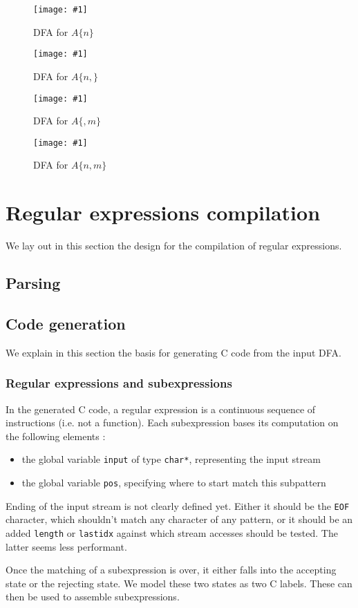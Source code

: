 \documentclass[11pt,a4paper]{report}
\newcommand{\regexp}[1]{$#1$}
\newcommand{\ccode}[1]{\texttt{#1}}
\newcommand{\insertfa}[3]{
\begin{figure}[h!]
	\centering
	\texttt{[image: \#1]}
	\caption{#2}
\end{figure}
}
\newcommand{\smalldfa}[2]{\insertfa{./img/dfa/#1.png}{DFA for #2}{scale=0.7}}
\newcommand{\largedfa}[2]{\insertfa{./img/dfa/#1.png}{DFA for #2}{width=\textwidth}}
\begin{document}
\smalldfa{repeat-n-times}{\regexp{A\{n\}}}

\smalldfa{repeat-at-least-n-times}{\regexp{A\{n,\}}}

\smalldfa{repeat-at-most-m-times}{\regexp{A\{,m\}}}

\largedfa{repeat-between-n-and-m-times}{\regexp{A\{n,m\}}}

\chapter{Regular expressions compilation}

We lay out in this section the design for the compilation of regular expressions.

\section{Parsing}

\section{Code generation}

We explain in this section the basis for generating C code from the input DFA.

\subsection{Regular expressions and subexpressions}

In the generated C code, a regular expression is a continuous sequence of instructions (i.e. not a function). Each subexpression bases its computation on the following elements :
\begin{itemize}
\item the global variable \ccode{input} of type \ccode{char*}, representing the input stream
\item the global variable \ccode{pos}, specifying where to start match this subpattern
\end{itemize}

Ending of the input stream is not clearly defined yet. Either it should be the \texttt{EOF} character, which shouldn't match any character of any pattern, or it should be an added \ccode{length} or \ccode{lastidx} against which stream accesses should be tested. The latter seems less performant.

Once the matching of a subexpression is over, it either falls into the accepting state or the rejecting state. We model these two states as two C labels. These can then be used to assemble subexpressions.
\end{document}
